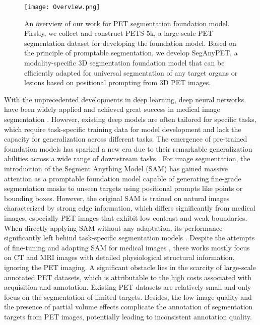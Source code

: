 \begin{figure*}[t]
	\texttt{[image: Overview.png]}
	\caption{An overview of our work for PET segmentation foundation model. Firstly, we collect and construct PETS-5k, a large-scale PET segmentation dataset for developing the foundation model. Based on the principle of promptable segmentation, we develop SegAnyPET, a modality-specific 3D segmentation foundation model that can be efficiently adapted for universal segmentation of any target organs or lesions based on positional prompting from 3D PET images.}
	\label{Overview}
\end{figure*}



With the unprecedented developments in deep learning, deep neural networks have been widely applied and achieved great success in medical image segmentation \cite{ronneberger2015u,isensee2020nnunet}.
However, existing deep models are often tailored for specific tasks, which require task-specific training data for model development and lack the capacity for generalization across different tasks. 
The emergence of pre-trained foundation models has sparked a new era due to their remarkable generalization abilities across a wide range of downstream tasks \cite{moor2023foundation,willemink2022toward}.
For image segmentation, the introduction of the Segment Anything Model (SAM) \cite{SAM} has gained massive attention as a promptable foundation model capable of generating fine-grade segmentation masks to unseen targets using positional prompts like points or bounding boxes.
However, the original SAM is trained on natural images characterized by strong edge information, which differs significantly from medical images, especially PET images that exhibit low contrast and weak boundaries. When directly applying SAM without any adaptation, its performance significantly left behind task-specific segmentation models \cite{SAM4MIS,SAM-Empirical}.
Despite the attempts of fine-tuning and adapting SAM for medical images \cite{MedSAM,3DSAM-adapter}, these works mostly focus on CT and MRI images with detailed physiological structural information, ignoring the PET imaging. 
A significant obstacle lies in the scarcity of large-scale annotated PET datasets, which is attributable to the high costs associated with acquisition and annotation.
Existing PET datasets \cite{AutoPET,hecktor} are relatively small and only focus on the segmentation of limited targets. 
Besides, the low image quality and the presence of partial volume effects complicate the annotation of segmentation targets from PET images, potentially leading to inconsistent annotation quality.



